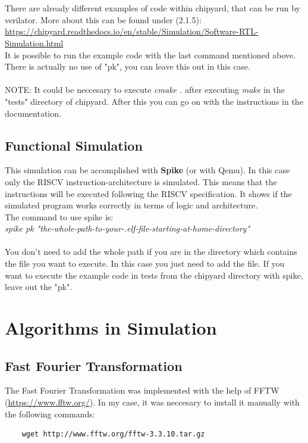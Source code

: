 \documentclass{article}
\begin{document}
{\begin{figure}[h]
\end{figure}
\\\\
There are already different examples of code within chipyard, that can be run by verilator. More about this can be found under (2.1.5):\\
\url{https://chipyard.readthedocs.io/en/stable/Simulation/Software-RTL-Simulation.html}\\
It is possible to run the example code with the last command mentioned above. There is actually no use of "pk", you can leave this out in this case.\\\\
NOTE: It could be neccesary to execute \textit{cmake .} after executing \textit{make} in the "tests" directory of chipyard. After this you can go on with the instructions in the documentation.

\subsection*{Functional Simulation}
This simulation can be accomplished with \textbf{Spike} (or with Qemu). In this case only the 
RISCV instruction-architecture is simulated. This means that the instructions will be executed 
following the RISCV specification. It shows if the simulated program works correctly in terms 
of logic and architecture.\\
The command to use spike is:\\
\textit{spike pk "the-whole-path-to-your-.elf-file-starting-at-home-directory"}\\\\
You don't need to add the whole path if you are in the directory which contains the file you want to execute. In this case you just need to add the file.
If you want to execute the example code in tests from the chipyard directory with spike, leave out the "pk".


\section*{Algorithms in Simulation}
\subsection*{Fast Fourier Transformation}
The Fast Fourier Transformation was implemented with the help of FFTW (\url{https://www.fftw.org/}). In my case, it was neccesary to install it manually with the following commands:\\
\begin{verbatim}
    wget http://www.fftw.org/fftw-3.3.10.tar.gz


\end{verbatim}}
\end{document}

